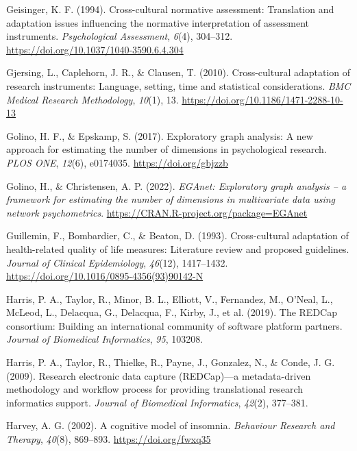\documentclass[
  ,doc,11pt, twoside,floatsintext]{apa6}
\newlength{\cslhangindent}
\newlength{\cslentryspacingunit} %
\newenvironment{CSLReferences}[2] %
 {%
  \setlength{\parindent}{0pt}
  \ifodd #1
  \let\oldpar\par
  \def\par{\hangindent=\cslhangindent\oldpar}
  \fi
  \setlength{\parskip}{#2\cslentryspacingunit}
 }%
 {}
\begin{document}
\begin{CSLReferences}{1}{0}
\leavevmode{}%
Geisinger, K. F. (1994). Cross-cultural normative assessment: {Translation} and adaptation issues influencing the normative interpretation of assessment instruments. \emph{Psychological Assessment}, \emph{6}(4), 304--312. \url{https://doi.org/10.1037/1040-3590.6.4.304}

\leavevmode{}%
Gjersing, L., Caplehorn, J. R., \& Clausen, T. (2010). Cross-cultural adaptation of research instruments: Language, setting, time and statistical considerations. \emph{BMC Medical Research Methodology}, \emph{10}(1), 13. \url{https://doi.org/10.1186/1471-2288-10-13}

\leavevmode{}%
Golino, H. F., \& Epskamp, S. (2017). Exploratory graph analysis: {A} new approach for estimating the number of dimensions in psychological research. \emph{PLOS ONE}, \emph{12}(6), e0174035. \url{https://doi.org/gbjzzb}

\leavevmode{}%
Golino, H., \& Christensen, A. P. (2022). \emph{EGAnet: Exploratory graph analysis -- a framework for estimating the number of dimensions in multivariate data using network psychometrics}. \url{https://CRAN.R-project.org/package=EGAnet}

\leavevmode{}%
Guillemin, F., Bombardier, C., \& Beaton, D. (1993). Cross-cultural adaptation of health-related quality of life measures: {Literature} review and proposed guidelines. \emph{Journal of Clinical Epidemiology}, \emph{46}(12), 1417--1432. \url{https://doi.org/10.1016/0895-4356(93)90142-N}

\leavevmode{}%
Harris, P. A., Taylor, R., Minor, B. L., Elliott, V., Fernandez, M., O'Neal, L., McLeod, L., Delacqua, G., Delacqua, F., Kirby, J., et al. (2019). The REDCap consortium: Building an international community of software platform partners. \emph{Journal of Biomedical Informatics}, \emph{95}, 103208.

\leavevmode{}%
Harris, P. A., Taylor, R., Thielke, R., Payne, J., Gonzalez, N., \& Conde, J. G. (2009). Research electronic data capture (REDCap)---a metadata-driven methodology and workflow process for providing translational research informatics support. \emph{Journal of Biomedical Informatics}, \emph{42}(2), 377--381.

\leavevmode{}%
Harvey, A. G. (2002). A cognitive model of insomnia. \emph{Behaviour Research and Therapy}, \emph{40}(8), 869--893. \url{https://doi.org/fwxq35}


\end{CSLReferences}
\end{document}
